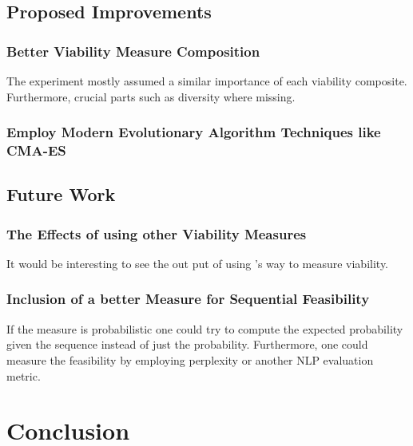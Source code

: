 \documentclass[12pt,a4paper]{report}
\begin{document}
\section{Proposed Improvements}
\subsection{Better Viability Measure Composition}
The experiment mostly assumed a similar importance of each viability composite. Furthermore, crucial parts such as diversity where missing.
\subsection{Employ Modern Evolutionary Algorithm Techniques like CMA-ES}


\section{Future Work}
\subsection{The Effects of using other Viability Measures}
It would be interesting to see the out put of using \citeauthor{hsieh_DiCE4ELInterpretingProcess_2021}'s way to measure viability.
\subsection{Inclusion of a better Measure for Sequential Feasibility}
If the measure is probabilistic one could try to compute the expected probability given the sequence instead of just the probability.
Furthermore, one could measure the feasibility by employing perplexity or another NLP evaluation metric. 

\chapter{Conclusion}
\label{sec:conclusion}


\printbibliography

\appendix
\end{document}
